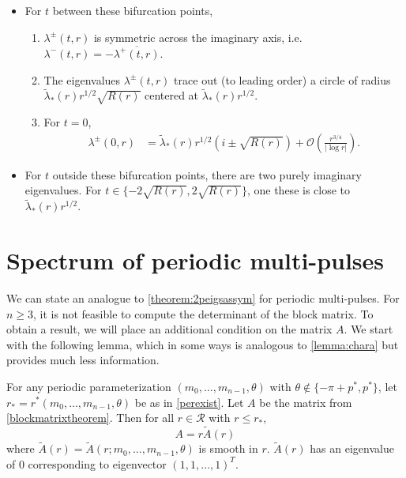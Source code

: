 \documentclass[thesis.tex]{subfiles}
\begin{document}
\begin{theorem}
\begin{itemize}
\item For $t$ between these bifurcation points, 
\begin{enumerate}
\item $\lambda^\pm(t, r)$ is symmetric across the imaginary axis, i.e. $\lambda^-(t, r) = -\overline{\lambda^+(t, r)}$. 
\item The eigenvalues $\lambda^\pm(t, r)$ trace out (to leading order) a circle of radius $\tilde{\lambda}_*(r) r^{1/2} \sqrt{ R(r)}$ centered at $\tilde{\lambda}_*(r) r^{1/2}$. 
\item For $t = 0$,
\begin{align*}
\lambda^\pm(0, r) &= \tilde{\lambda}_*(r) r^{1/2}\left(  i \pm \sqrt{ R(r)} \right)  + \mathcal{O}\left( \frac{r^{3/4}}{|\log r|} \right).
\end{align*}
\end{enumerate}

\item For $t$ outside these bifurcation points, there are two purely imaginary eigenvalues. For $t \in \{ -2\sqrt{R(r)}, 2\sqrt{R(r)} \}$, one these is close to $\tilde{\lambda}_*(r) r^{1/2}$.

\end{itemize}

\end{theorem}

\section{Spectrum of periodic multi-pulses}\label{sec:pereig}

We can state an analogue to \cref{theorem:2peigsassym} for periodic multi-pulses. For $n \geq 3$, it is not feasible to compute the determinant of the block matrix. To obtain a result, we will place an additional condition on the matrix $A$. We start with the following lemma, which in some ways is analogous to \cref{lemma:chara} but provides much less information.

\begin{lemma}\label{lemma:charmatrixA}
For any periodic parameterization $(m_0, \dots, m_{n-1}, \theta)$ with $\theta \notin \{-\pi + p^*, p^* \}$, let $r_* = r^*(m_0, \dots, m_{n-1}, \theta)$ be as in \cref{perexist}. Let $A$ be the matrix from \cref{blockmatrixtheorem}. Then for all $r \in \mathcal{R}$ with $r \leq r_*$,
\[
A = r \tilde{A}(r)
\]
where $\tilde{A}(r) = \tilde{A}(r; m_0, \dots, m_{n-1}, \theta)$ is smooth in $r$. $\tilde{A}(r)$ has an eigenvalue of 0 corresponding to eigenvector $(1, 1, \dots, 1)^T$. 
\end{lemma}
\end{document}
